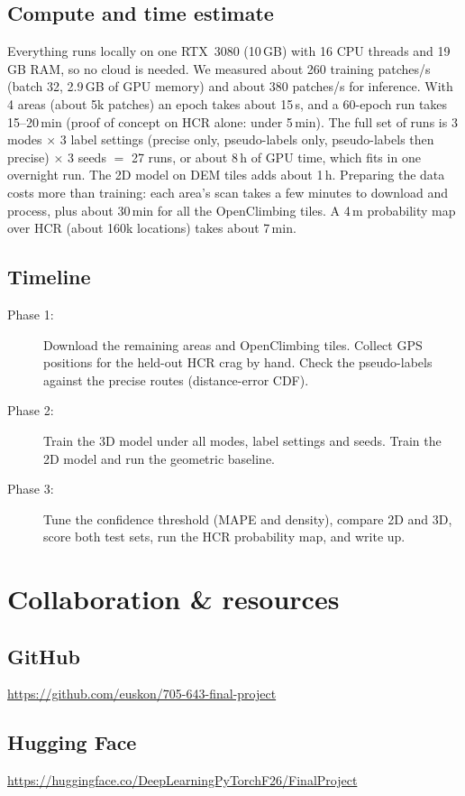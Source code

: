 \documentclass{mva2011}
\begin{document}
\subsection{Compute and time estimate}
    Everything runs locally on one RTX~3080 (10\,GB) with 16 CPU threads and 19\,GB RAM, so no cloud is needed. We measured about 260 training patches/s (batch 32, 2.9\,GB of GPU memory) and about 380 patches/s for inference. With 4 areas (about 5k patches) an epoch takes about 15\,s, and a 60-epoch run takes 15--20\,min (proof of concept on HCR alone: under 5\,min). The full set of runs is 3 modes $\times$ 3 label settings (precise only, pseudo-labels only, pseudo-labels then precise) $\times$ 3 seeds $=$ 27 runs, or about 8\,h of GPU time, which fits in one overnight run. The 2D model on DEM tiles adds about 1\,h. Preparing the data costs more than training: each area's scan takes a few minutes to download and process, plus about 30\,min for all the OpenClimbing tiles. A 4\,m probability map over HCR (about 160k locations) takes about 7\,min.

\subsection{Timeline}
    \begin{description}
    \item[Phase 1:] Download the remaining areas and OpenClimbing tiles. Collect GPS positions for the held-out HCR crag by hand. Check the pseudo-labels against the precise routes (distance-error CDF).
    \item[Phase 2:] Train the 3D model under all modes, label settings and seeds. Train the 2D model and run the geometric baseline.
    \item[Phase 3:] Tune the confidence threshold (MAPE and density), compare 2D and 3D, score both test sets, run the HCR probability map, and write up.
    \end{description}

\section{Collaboration \& resources}
    \subsection{GitHub}
   \url{https://github.com/euskon/705-643-final-project}
    \subsection{Hugging Face}
    \url{https://huggingface.co/DeepLearningPyTorchF26/FinalProject}
\end{document}

